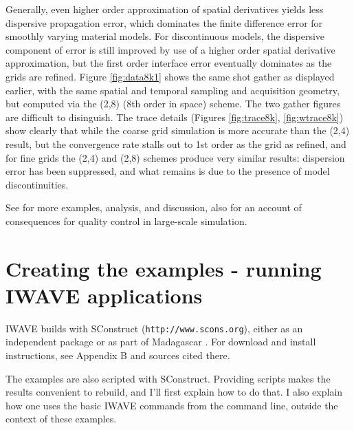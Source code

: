 Generally, even higher order approximation of spatial derivatives
yields less dispersive propagation error, which dominates the finite
difference error for smoothly varying material models. For
discontinuous models, the dispersive component of error is still
improved by use of a higher order spatial derivative approximation,
but the first order interface error eventually dominates as the grids
are refined. Figure \ref{fig:data8k1} shows the same shot gather as
displayed earlier, with the same spatial and temporal sampling and
acquisition geometry, but computed via the (2,8) (8th order in space)
scheme. The two gather figures are difficult to disinguish. The trace
details (Figures \ref{fig:trace8k}, \ref{fig:wtrace8k}) show clearly
that while the coarse grid simulation is more accurate than the (2,4)
result, but the convergence rate stalls out to 1st order as the grid
as refined, and for fine grids the (2,4) and (2,8) schemes produce
very similar results: dispersion error has been suppressed, and what
remains is due to the presence of model discontinuities.

See
\cite[]{SymesVdovina:09} for more examples, analysis, and discussion,
also \cite[]{FehlerKeliher:2011} for an account of consequences for quality control in
large-scale simulation.

\section{Creating the examples - running IWAVE applications}
IWAVE builds with SConstruct ({\tt http://www.scons.org}), either as an
independent package or as part of Madagascar \cite[]{Madagascar}. For
download and install instructions, see Appendix B and sources cited
there.

The examples are also scripted with SConstruct. Providing scripts
makes the results convenient to rebuild, and I'll first explain how to do
that. I also explain how one uses the basic IWAVE commands from
the command line, outside the context of these examples.

